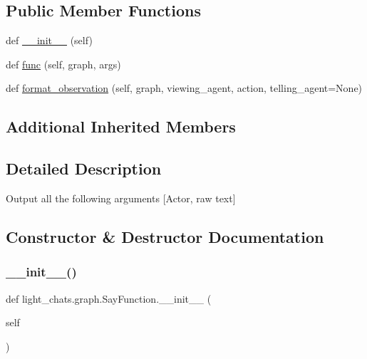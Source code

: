 \subsection*{Public Member Functions}
\begin{DoxyCompactItemize}
\item 
def \hyperlink{classlight__chats_1_1graph_1_1SayFunction_a2d42dde7366558243d4282cab89e9184}{\+\_\+\+\_\+init\+\_\+\+\_\+} (self)
\item 
def \hyperlink{classlight__chats_1_1graph_1_1SayFunction_af14fb1e5a036d9c537ea2915f2c76275}{func} (self, graph, args)
\item 
def \hyperlink{classlight__chats_1_1graph_1_1SayFunction_a20e5908183144f719a93276707938894}{format\+\_\+observation} (self, graph, viewing\+\_\+agent, action, telling\+\_\+agent=None)
\end{DoxyCompactItemize}
\subsection*{Additional Inherited Members}


\subsection{Detailed Description}
\begin{DoxyVerb}Output all the following arguments [Actor, raw text]
\end{DoxyVerb}
 

\subsection{Constructor \& Destructor Documentation}
\mbox{\label{classlight__chats_1_1graph_1_1SayFunction_a2d42dde7366558243d4282cab89e9184}} 
\subsubsection{\texorpdfstring{\+\_\+\+\_\+init\+\_\+\+\_\+()}{\_\_init\_\_()}}
{\footnotesize\ttfamily def light\+\_\+chats.\+graph.\+Say\+Function.\+\_\+\+\_\+init\+\_\+\+\_\+ (\begin{DoxyParamCaption}\item[{}]{self }\end{DoxyParamCaption})}



